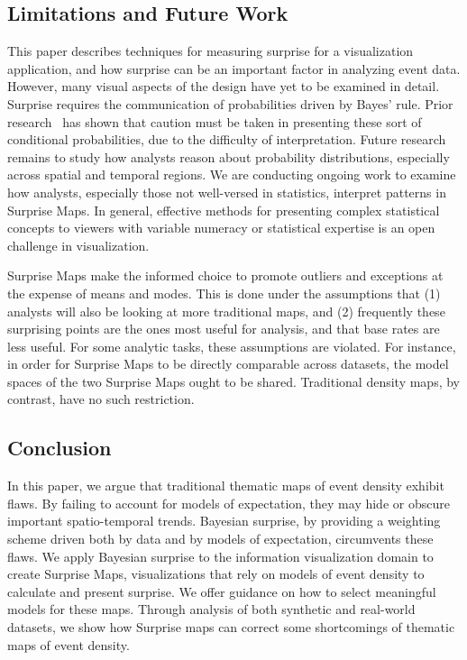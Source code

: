 \documentclass[journal]{vgtc}                %
\begin{document}
\subsection{Limitations and Future Work}

This paper describes techniques for measuring surprise for a visualization application, and how surprise can be an important factor in analyzing event data. However, many visual aspects of the design have yet to be examined in detail. Surprise requires the communication of probabilities driven by Bayes' rule. Prior research~\cite{micallef2012assessing,ottley2016improving} has shown that caution must be taken in presenting these sort of conditional probabilities, due to the difficulty of interpretation. Future research remains to study how analysts reason about probability distributions, especially across spatial and temporal regions. We are conducting ongoing work to examine how analysts, especially those not well-versed in statistics, interpret patterns in Surprise Maps. In general, effective methods for presenting complex statistical concepts to viewers with variable numeracy or statistical expertise is an open challenge in visualization.

Surprise Maps make the informed choice to promote outliers and exceptions at the expense of means and modes. This is done under the assumptions that (1) analysts will also be looking at more traditional maps, and (2) frequently these surprising points are the ones most useful for analysis, and that base rates are less useful. For some analytic tasks, these assumptions are violated. For instance, in order for Surprise Maps to be directly comparable across datasets, the model spaces of the two Surprise Maps ought to be shared. Traditional density maps, by contrast, have no such restriction.

\subsection{Conclusion}

In this paper, we argue that traditional thematic maps of event density exhibit flaws. By failing to account for models of expectation, they may hide or obscure important spatio-temporal trends. Bayesian surprise, by providing a weighting scheme driven both by data and by models of expectation, circumvents these flaws. We apply Bayesian surprise to the information visualization domain to create Surprise Maps, visualizations that rely on models of event density to calculate and present surprise. We offer guidance on how to select meaningful models for these maps. Through analysis of both synthetic and real-world datasets, we show how Surprise maps can correct some shortcomings of thematic maps of event density.




\end{document}
